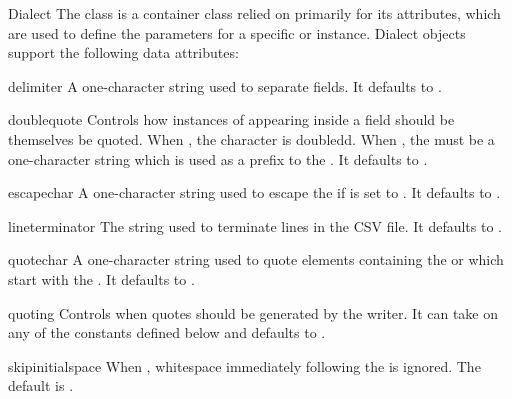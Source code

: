 \begin{classdesc*}{Dialect}{}
The  class is a container class relied on primarily for its
attributes, which are used to define the parameters for a specific
 or  instance.  Dialect objects support the
following data attributes:

\begin{memberdesc}[string]{delimiter}
A one-character string used to separate fields.  It defaults to .
\end{memberdesc}

\begin{memberdesc}[boolean]{doublequote}
Controls how instances of  appearing inside a field should be
themselves be quoted.  When , the character is doubledd.
When , the  must be a one-character string
which is used as a prefix to the .  It defaults to
.
\end{memberdesc}

\begin{memberdesc}{escapechar}
A one-character string used to escape the  if 
is set to .  It defaults to .
\end{memberdesc}

\begin{memberdesc}[string]{lineterminator}
The string used to terminate lines in the CSV file.  It defaults to
.
\end{memberdesc}

\begin{memberdesc}[string]{quotechar}
A one-character string used to quote elements containing the 
or which start with the .  It defaults to .
\end{memberdesc}

\begin{memberdesc}[integer]{quoting}
Controls when quotes should be generated by the writer.  It can take on any
of the  constants defined below and defaults to
. 
\end{memberdesc}

\begin{memberdesc}[boolean]{skipinitialspace}
When , whitespace immediately following the 
is ignored.  The default is .
\end{memberdesc}

\end{classdesc*}

